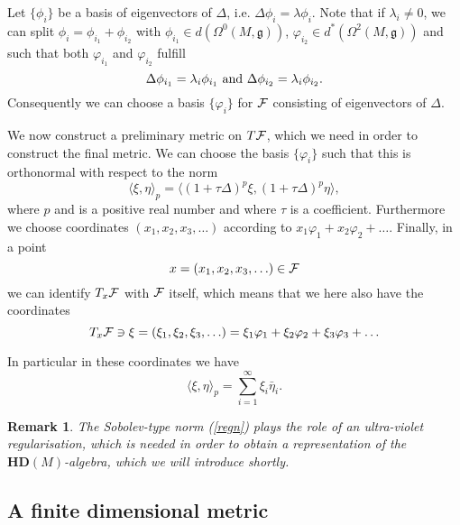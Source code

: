 \documentclass[letterpaper,12pt]{article}
\def\cf{{\cal F}}
\newtheorem{remark}{Remark}
\newcommand{\cF}{{\cal F}}
\begin{document}
Let $\{ \phi_i\}$ be a basis of eigenvectors of $\Delta$, i.e. $\Delta \phi_i=\lambda \phi_i$. Note that if $\lambda_i\not= 0$, we can split $\phi_i=\phi_{i_1}+\phi_{i_2}$ with $\phi_{i_1}\in d(\Omega^0(M,\mathfrak{g}))$, $\varphi_{i_2}\in d^*(\Omega^2(M,\mathfrak{g}))$ and such that both $\varphi_{i_1}$ and $\varphi_{i_2}$ fulfill
\begin{equation*}
    \Delta \phi_{i_1}=\lambda_i \phi_{i_1} \hbox{ and }\Delta \phi_{i_2}=\lambda_i \phi_{i_2} . %
\end{equation*}
Consequently we can choose a basis $\{  \varphi_i \}$ for $\cf$ consisting of eigenvectors of $\Delta$. 





We now construct a preliminary metric on $T\cf$, which we need in order to construct the final metric. We can choose the basis $\{ \varphi_i\}$ such that this is orthonormal with respect to the norm 
\begin{equation}
\langle \xi , \eta \rangle_p=\langle (1+\tau\Delta)^p \xi, (1+\tau\Delta)^p \eta \rangle,  
\label{regn}
\end{equation}
where $p$ and is a positive real number and where $\tau$ is a coefficient. Furthermore we choose coordinates $(x_1,x_2,x_3,\ldots )$ according to $x_1\varphi_1+x_2\varphi_2+\ldots $. Finally, in a point 
$$x=(x_1,x_2,x_3,\ldots) \in \cF $$
we can identify $T_x\cF$ with $\cF$ itself, which means that we here also have the coordinates 
$$T_x\cf\ni \xi=(\xi_1,\xi_2,\xi_3,\ldots )=\xi_1\varphi_1+\xi_2\varphi_2+\xi_3\varphi_3+\ldots $$

In particular in these coordinates we have
$$\langle \xi , \eta    \rangle_p =\sum_{i=1}^\infty \xi_i\bar{\eta}_i .$$


\begin{remark}
The Sobolev-type norm (\ref{regn}) plays the role of an ultra-violet regularisation, which is needed in order to obtain a representation of the $\mathbf{HD}(M)$-algebra, which we will introduce shortly.
\end{remark}



\subsection{A finite dimensional metric}
\end{document}

